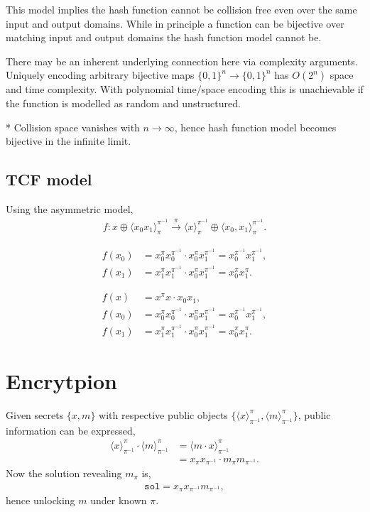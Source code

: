 \documentclass[twocolumn, aps, amsmath, amssymb, nofootinbib, superscriptaddress, longbibliography, doublefloatfix, table-of-contents, eqsecnum, rmp]{revtex4-2}
\def\braid#1#2#3#4{\langle#1,#2\rangle_{#3}^{#4}}
\def\selfbraid#1#2#3{\langle#1\rangle_{#2}^{#3}}
\begin{document}
This model implies the hash function cannot be collision free even over the same input and output domains. While in principle a function can be bijective over matching input and output domains the hash function model cannot be.

There may be an inherent underlying connection here via complexity arguments. Uniquely encoding arbitrary bijective maps \mbox{$\{0,1\}^n\to \{0,1\}^n$} has $O(2^n)$ space and time complexity. With polynomial time/space encoding this is unachievable if the function is modelled as random and unstructured.

* Collision space vanishes with $n\to\infty$, hence hash function model becomes bijective in the infinite limit. 

\subsection{TCF model}

Using the asymmetric model,
\begin{align}
	f: x\oplus \selfbraid{x_0 x_1}{\pi}{\pi^{-1}} \xrightarrow{\pi} \selfbraid{x}{\pi}{\pi^{-1}} \oplus \braid{x_0}{x_1}{\pi}{\pi^{-1}}.
\end{align}

\begin{align}
	f(x_0) &= x_0^\pi x_0^{\pi^{-1}} \cdot x_0^\pi x_1^{\pi^{-1}} = x_0^{\pi^{-1}} x_1^{\pi^{-1}},\nonumber\\
	f(x_1) &= x_1^\pi x_1^{\pi^{-1}} \cdot x_0^\pi x_1^{\pi^{-1}} = x_0^{\pi} x_1^{\pi}.
\end{align}

\begin{align}
	f(x) &= x^\pi x \cdot x_0 x_1,\nonumber\\
	f(x_0) &= x_0^\pi x_0^{\pi^{-1}} \cdot x_0^\pi x_1^{\pi^{-1}} = x_0^{\pi^{-1}} x_1^{\pi^{-1}},\nonumber\\
	f(x_1) &= x_1^\pi x_1^{\pi^{-1}} \cdot x_0^\pi x_1^{\pi^{-1}} = x_0^{\pi} x_1^{\pi}.
\end{align}

\section{Encrytpion}

Given secrets $\{x,m\}$ with respective public objects $\{\selfbraid{x}{\pi^{-1}}{\pi},\selfbraid{m}{{\pi}^{-1}}{\pi}\}$, public information can be expressed,
\begin{align}
	\selfbraid{x}{\pi^{-1}}{\pi} \cdot \selfbraid{m}{{\pi}^{-1}}{\pi} &= \selfbraid{m\cdot x}{{\pi}^{-1}}{\pi} \nonumber\\
	&= x_{\pi}x_{\pi^{-1}} \cdot m_\pi m_{\pi^{-1}}.
\end{align}
Now the solution revealing $m_\pi$ is,
\begin{align}
	\mathtt{sol} = x_\pi x_{\pi^{-1}} m_{\pi^{-1}},
\end{align}
hence unlocking $m$ under known $\pi$.
\end{document}
